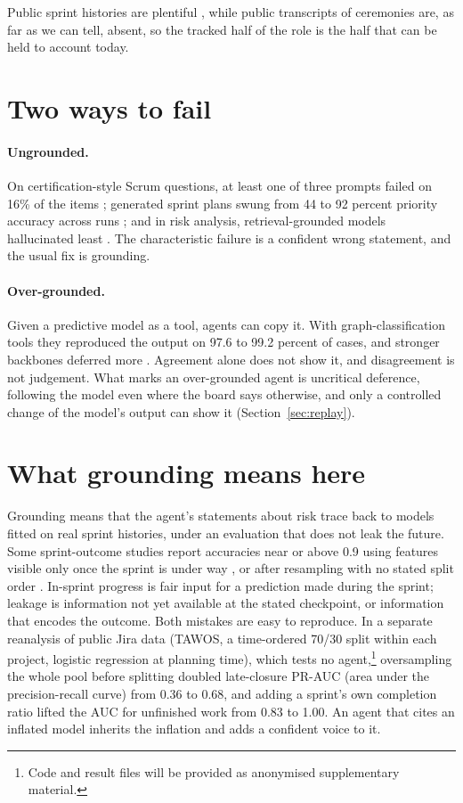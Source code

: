\documentclass[pmlr]{jmlr}
\begin{document}
Public sprint histories are plentiful \citep{tawos}, while public transcripts of ceremonies are, as far as we can tell, absent, so the tracked half of the role is the half that can be held to account today.

\section{Two ways to fail}
\label{sec:fail}

\paragraph{Ungrounded.} On certification-style Scrum questions, at least one of three prompts failed on 16\% of the items \citep{psm}; generated sprint plans swung from 44 to 92 percent priority accuracy across runs \citep{yoon}; and in risk analysis, retrieval-grounded models hallucinated least \citep{esem24}. The characteristic failure is a confident wrong statement, and the usual fix is grounding.

\paragraph{Over-grounded.} Given a predictive model as a tool, agents can copy it. With graph-classification tools they reproduced the output on 97.6 to 99.2 percent of cases, and stronger backbones deferred more \citep{tool}. Agreement alone does not show it, and disagreement is not judgement. What marks an over-grounded agent is uncritical deference, following the model even where the board says otherwise, and only a controlled change of the model's output can show it (Section~\ref{sec:replay}).

\section{What grounding means here}
\label{sec:ground}

Grounding means that the agent's statements about risk trace back to models fitted on real sprint histories, under an evaluation that does not leak the future. Some sprint-outcome studies report accuracies near or above 0.9 using features visible only once the sprint is under way \citep{perez}, or after resampling with no stated split order \citep{obike}. In-sprint progress is fair input for a prediction made during the sprint; leakage is information not yet available at the stated checkpoint, or information that encodes the outcome. Both mistakes are easy to reproduce. In a separate reanalysis of public Jira data (TAWOS, a time-ordered 70/30 split within each project, logistic regression at planning time), which tests no agent,\footnote{Code and result files will be provided as anonymised supplementary material.} oversampling the whole pool before splitting doubled late-closure PR-AUC (area under the precision-recall curve) from 0.36 to 0.68, and adding a sprint's own completion ratio lifted the AUC for unfinished work from 0.83 to 1.00. An agent that cites an inflated model inherits the inflation and adds a confident voice to it.
\end{document}
